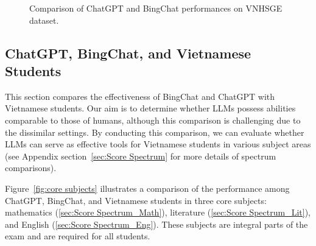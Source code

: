 \documentclass{article}
\begin{document}
{\begin{figure}[h!]
\begin{center}
		\end{center}
		\caption{Comparison of ChatGPT and BingChat performances on VNHSGE dataset.}
		\label{fig:ChatGPT_BingChat_exam}
	\end{figure}
	
	
	
	
	
	\subsection{ChatGPT, BingChat, and Vietnamese Students}
	
	This section compares the effectiveness of BingChat and ChatGPT with Vietnamese students. Our aim is to determine whether LLMs possess abilities comparable to those of humans, although this comparison is challenging due to the dissimilar settings. By conducting this comparison, we can evaluate whether LLMs can serve as effective tools for Vietnamese students in various subject areas (see Appendix section~\ref{sec:Score Spectrum} for more details of spectrum comparisons).
	
	Figure~\ref{fig:core subjects} illustrates a comparison of the performance among ChatGPT, BingChat, and Vietnamese students in three core subjects: mathematics (\ref{sec:Score Spectrum_Math}), literature (\ref{sec:Score Spectrum_Lit}), and English (\ref{sec:Score Spectrum_Eng}). These subjects are integral parts of the exam and are required for all students. 
	
}
\end{document}
